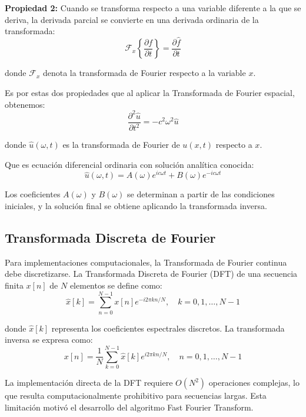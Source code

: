\documentclass[a4paper]{article}
\begin{document}
\textbf{Propiedad 2:} Cuando se transforma respecto a una variable diferente a la que se deriva, la derivada parcial se convierte en una derivada ordinaria de la transformada:
\begin{equation}
    \mathcal{F}_x\left\{\frac{\partial f}{\partial t}\right\} = \frac{\partial \hat{f}}{\partial t}
\end{equation}

donde $\mathcal{F}_x$ denota la transformada de Fourier respecto a la variable $x$.

Es por estas dos propiedades que al aplicar la Transformada de Fourier espacial, obtenemos:
\begin{equation}
    \frac{\partial^2 \hat{u}}{\partial t^2} = -c^2 \omega^2 \hat{u}
\end{equation}

donde $\hat{u}(\omega, t)$ es la transformada de Fourier de $u(x,t)$ respecto a $x$.

Que es ecuación diferencial ordinaria con solución analítica conocida:
\begin{equation}
    \hat{u}(\omega, t) = A(\omega) e^{ic\omega t} + B(\omega) e^{-ic\omega t}
\end{equation}

Los coeficientes $A(\omega)$ y $B(\omega)$ se determinan a partir de las condiciones iniciales, y la solución final se obtiene
aplicando la transformada inversa.

\subsection{Transformada Discreta de Fourier}

Para implementaciones computacionales, la Transformada de Fourier continua debe discretizarse. La Transformada Discreta de Fourier (DFT) de una secuencia finita $x[n]$ de $N$ elementos se define como:
\begin{equation}
    \hat{x}[k] = \sum_{n=0}^{N-1} x[n] e^{-i2\pi kn/N}, \quad k = 0, 1, \ldots, N-1
\end{equation}

donde $\hat{x}[k]$ representa los coeficientes espectrales discretos. La transformada inversa se expresa como:
\begin{equation}
    x[n] = \frac{1}{N} \sum_{k=0}^{N-1} \hat{x}[k] e^{i2\pi kn/N}, \quad n = 0, 1, \ldots, N-1
\end{equation}

La implementación directa de la DFT requiere $O(N^2)$ operaciones complejas, lo que resulta computacionalmente prohibitivo para
secuencias largas. Esta limitación motivó el desarrollo del algoritmo Fast Fourier Transform.
\end{document}

